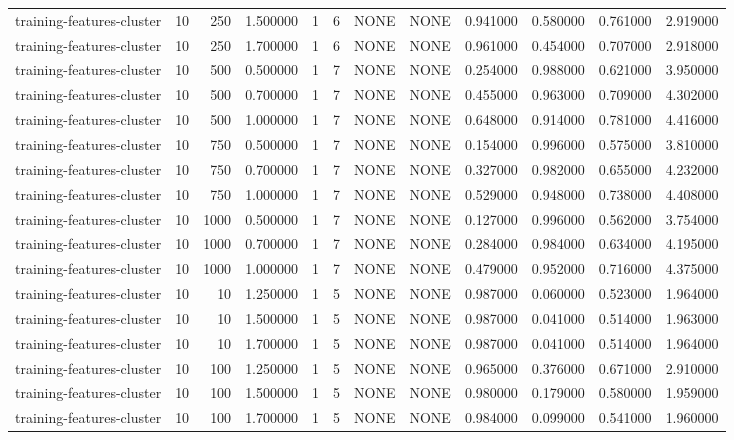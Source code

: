 \begin{tabular}{lrrrllllrrrr}
training-features-cluster & 10 & 250 & 1.500000 & 1 & 6 & NONE & NONE & 0.941000 & 0.580000 & 0.761000 & 2.919000 \\
training-features-cluster & 10 & 250 & 1.700000 & 1 & 6 & NONE & NONE & 0.961000 & 0.454000 & 0.707000 & 2.918000 \\
training-features-cluster & 10 & 500 & 0.500000 & 1 & 7 & NONE & NONE & 0.254000 & 0.988000 & 0.621000 & 3.950000 \\
training-features-cluster & 10 & 500 & 0.700000 & 1 & 7 & NONE & NONE & 0.455000 & 0.963000 & 0.709000 & 4.302000 \\
training-features-cluster & 10 & 500 & 1.000000 & 1 & 7 & NONE & NONE & 0.648000 & 0.914000 & 0.781000 & 4.416000 \\
training-features-cluster & 10 & 750 & 0.500000 & 1 & 7 & NONE & NONE & 0.154000 & 0.996000 & 0.575000 & 3.810000 \\
training-features-cluster & 10 & 750 & 0.700000 & 1 & 7 & NONE & NONE & 0.327000 & 0.982000 & 0.655000 & 4.232000 \\
training-features-cluster & 10 & 750 & 1.000000 & 1 & 7 & NONE & NONE & 0.529000 & 0.948000 & 0.738000 & 4.408000 \\
training-features-cluster & 10 & 1000 & 0.500000 & 1 & 7 & NONE & NONE & 0.127000 & 0.996000 & 0.562000 & 3.754000 \\
training-features-cluster & 10 & 1000 & 0.700000 & 1 & 7 & NONE & NONE & 0.284000 & 0.984000 & 0.634000 & 4.195000 \\
training-features-cluster & 10 & 1000 & 1.000000 & 1 & 7 & NONE & NONE & 0.479000 & 0.952000 & 0.716000 & 4.375000 \\
training-features-cluster & 10 & 10 & 1.250000 & 1 & 5 & NONE & NONE & 0.987000 & 0.060000 & 0.523000 & 1.964000 \\
training-features-cluster & 10 & 10 & 1.500000 & 1 & 5 & NONE & NONE & 0.987000 & 0.041000 & 0.514000 & 1.963000 \\
training-features-cluster & 10 & 10 & 1.700000 & 1 & 5 & NONE & NONE & 0.987000 & 0.041000 & 0.514000 & 1.964000 \\
training-features-cluster & 10 & 100 & 1.250000 & 1 & 5 & NONE & NONE & 0.965000 & 0.376000 & 0.671000 & 2.910000 \\
training-features-cluster & 10 & 100 & 1.500000 & 1 & 5 & NONE & NONE & 0.980000 & 0.179000 & 0.580000 & 1.959000 \\
training-features-cluster & 10 & 100 & 1.700000 & 1 & 5 & NONE & NONE & 0.984000 & 0.099000 & 0.541000 & 1.960000 \\

\end{tabular}
